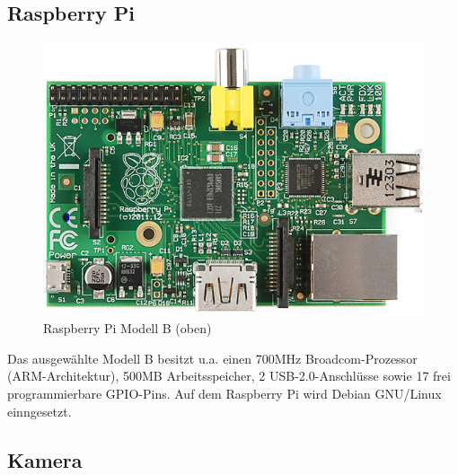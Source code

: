 \subsection{Raspberry Pi}

\begin{figure}[ht]
    \centering
    \includegraphics[scale=0.3]{images/raspberrypi}
    \caption{ \cite{img01} Raspberry Pi Modell B (oben)}
    \label{fig:raspberrypi}
\end{figure}
Das ausgew\"ahlte Modell B besitzt u.a. einen 700MHz Broadcom-Prozessor (ARM-Architektur), 500MB Arbeitsspeicher, 2 USB-2.0-Anschl\"usse sowie 17 frei programmierbare GPIO-Pins.
Auf dem Raspberry Pi wird Debian GNU/Linux einngesetzt.

\newpage

\subsection{Kamera}

